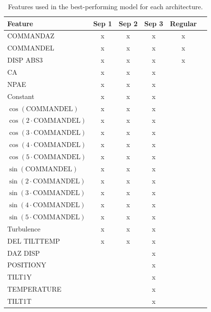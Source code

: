 \begin{table}[!htbp]
    \centering
    \caption{Features used in the best-performing model for each architecture.}
    \begin{tabular}{|l|ccccc|}
        \hline
        Feature & Sep 1 & Sep 2 & Sep 3 & Regular & \\ \hline
        COMMANDAZ & x & x & x & x & \\ \hline
        COMMANDEL & x & x & x & x & \\ \hline
        DISP ABS3 & x & x & x & x & \\ \hline
        CA & x & x & x & & \\ \hline
        NPAE & x & x & x & & \\ \hline
        Constant & x & x & x & & \\ \hline
        $\cos{(\text{COMMANDEL})}$ & x & x & x & & \\ \hline
        $\cos{(2\cdot \text{COMMANDEL})}$ & x & x & x & & \\ \hline
        $\cos{(3\cdot \text{COMMANDEL})}$ & x & x & x & & \\ \hline
        $\cos{(4\cdot \text{COMMANDEL})}$ & x & x & x & & \\ \hline
        $\cos{(5\cdot \text{COMMANDEL})}$ & x & x & x & & \\ \hline
        $\sin{(\text{COMMANDEL})}$ & x & x & x & & \\ \hline
        $\sin{(2 \cdot \text{COMMANDEL})}$ & x & x & x & & \\ \hline
        $\sin{(3 \cdot \text{COMMANDEL})}$ & x & x & x & & \\ \hline
        $\sin{(4 \cdot \text{COMMANDEL})}$ & x & x & x & & \\ \hline
        $\sin{(5 \cdot \text{COMMANDEL})}$ & x & x & x & & \\ \hline
        Turbulence & x & x & x & & \\ \hline
        DEL TILTTEMP & x & x & x & & \\ \hline
        DAZ DISP & & & x & & \\ \hline
        POSITIONY & & & x & & \\ \hline
        TILT1Y & & & x & & \\ \hline
        TEMPERATURE & & & x & & \\ \hline
        TILT1T & & & x & & \\ \hline
    \end{tabular}
    \label{tab:exp1_features}
\end{table}


